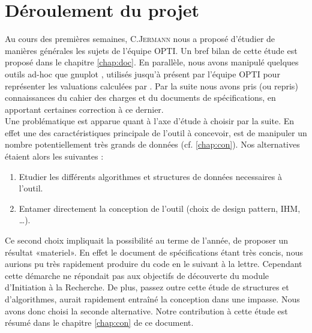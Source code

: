 \section{Déroulement du projet}
Au cours des premières semaines, C.\textsc{Jermann} nous a proposé d'étudier de manières générales les sujets de l'équipe \textsc{OPTI}. Un bref bilan de cette étude est proposé dans le chapitre \ref{chap:doc}. En parallèle, nous avons manipulé quelques outils ad-hoc que gnuplot \cite{gnu}, utilisés jusqu'à présent par l'équipe \textsc{OPTI} pour représenter les valuations calculées par \realpaver. Par la suite nous avons pris (ou repris) connaissances du cahier des charges et du documents de spécifications, en apportant certaines correction à ce dernier.  \\
Une problématique est apparue quant à l'axe d'étude à choisir par la suite. En effet une des caractéristiques principale de l'outil à concevoir, est de manipuler un nombre potentiellement très grands de données (cf. \ref{chap:con}). Nos alternatives étaient alors les suivantes : 
\begin{enumerate}
\item
Etudier les différents algorithmes et structures de données necessaires à l'outil.
\item
Entamer directement la conception de l'outil (choix de design pattern, IHM, \dots).
\end{enumerate} 
Ce second choix impliquait la possibilité au terme de l'année, de proposer un résultat «materiel». En effet le document de spécifications étant très concis, nous aurions pu très rapidement produire du code en le suivant à la lettre. Cependant cette démarche ne répondait pas aux objectifs de découverte du module d'Initiation à la Recherche. De plus, passez outre cette étude de structures et d'algorithmes, aurait rapidement entraîné la conception dans une impasse. Nous avons donc choisi la seconde alternative. Notre contribution à cette étude est résumé dans le chapitre \ref{chap:con} de ce document.

